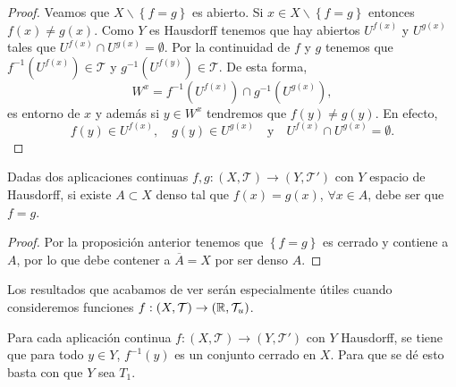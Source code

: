 \begin{proof}
	Veamos que $\displaystyle X \backslash \left\{ f = g\right\}  $ es abierto. Si $\displaystyle x \in X \backslash \left\{ f = g\right\}  $ entonces $\displaystyle f\left(x\right)\neq g\left(x\right) $. Como $\displaystyle Y $ es Hausdorff tenemos que hay abiertos $\displaystyle U^{f\left(x\right)} $ y $\displaystyle U^{g\left(x\right)} $ tales que $\displaystyle U^{f\left(x\right)} \cap U^{g\left(x\right)} = \emptyset $. 
	Por la continuidad de $\displaystyle f $ y $\displaystyle g $ tenemos que $\displaystyle f^{-1}\left(U^{f\left(x\right)}\right)\in \mathcal{T} $ y $\displaystyle g^{-1}\left(U^{f\left(y\right)}\right)\in \mathcal{T} $. De esta forma, 
	\[W^{x} = f^{-1}\left(U^{f\left(x\right)}\right)\cap g^{-1}\left(U^{g\left(x\right)}\right) ,\]
	es entorno de $\displaystyle x $ y además si $\displaystyle y \in W^{x} $ tendremos que $\displaystyle f\left(y\right)\neq g\left(y\right) $. En efecto, 
	\[f\left(y\right)\in U^{f\left(x\right)}, \quad g\left(y\right) \in U^{g\left(x\right)} \quad \text{y} \quad  U^{f\left(x\right)} \cap U^{g\left(x\right)}= \emptyset   .\]
\end{proof}
\begin{colorary}
Dadas dos aplicaciones continuas $\displaystyle f,g : \left(X, \mathcal{T}\right)\to \left(Y, \mathcal{T}'\right) $ con $\displaystyle Y $ espacio de Hausdorff, si existe $\displaystyle A \subset X $ denso tal que $\displaystyle f\left(x\right)=g\left(x\right) $, $\displaystyle \forall x \in A $, debe ser que $\displaystyle f = g $.
\end{colorary}
\begin{proof}
	Por la proposición anterior tenemos que $\displaystyle \left\{ f = g\right\}  $ es cerrado y contiene a $\displaystyle A $, por lo que debe contener a $\displaystyle \overline{A}= X $ por ser denso $\displaystyle A $. 
\end{proof}

\begin{observation}
Los resultados que acabamos de ver serán especialmente útiles cuando consideremos funciones $\displaystyle f : \left(X, \mathcal{T}\right) \to \left(\mathbb{R}, \mathcal{T}_{u}\right) $. 
\end{observation}
\begin{observation}
Para cada aplicación continua $\displaystyle f : \left(X, \mathcal{T}\right)\to \left(Y, \mathcal{T}'\right) $ con $\displaystyle Y $ Hausdorff, se tiene que para todo $\displaystyle y \in Y $, $\displaystyle f^{-1}\left(y\right) $ es un conjunto cerrado en $\displaystyle X $. Para que se dé esto basta con que $\displaystyle Y $ sea $\displaystyle T_{1} $.
\end{observation}

